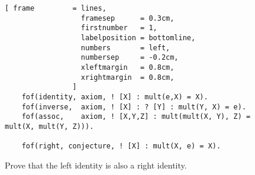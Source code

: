 \begin{figure}[!ht]
\centering
\begin{Verbatim}[ frame         = lines, 
                  framesep      = 0.3cm, 
                  firstnumber   = 1,
                  labelposition = bottomline,
                  numbers       = left,
                  numbersep     = -0.2cm,
                  xleftmargin   = 0.8cm,
                  xrightmargin  = 0.8cm,
                ]
    fof(identity, axiom, ! [X] : mult(e,X) = X).
    fof(inverse,  axiom, ! [X] : ? [Y] : mult(Y, X) = e).
    fof(assoc,    axiom, ! [X,Y,Z] : mult(mult(X, Y), Z) = mult(X, mult(Y, Z))).
    
    fof(right, conjecture, ! [X] : mult(X, e) = X).
\end{Verbatim}
\vspace*{-0.3cm}
\caption{Prove that the left identity is also a right identity.}
\label{fig:group-right-identity.tptp}
\end{figure}

